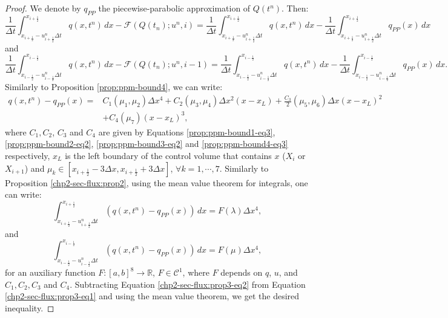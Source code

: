 \begin{proof}
	We denote by $q_{PP}$ the piecewise-parabolic approximation of $Q(t^n)$. Then:
	\begin{equation*}
	\frac{1}{\Delta t}\int^{x_{i+\frac{1}{2}}}_{x_{i+\frac{1}{2}}-u_{i+\frac{1}{2}}^n \Delta t} q(x,t^n)\,dx -
	\mathcal{F}(Q(t_n);u^n,i) = 	
	\frac{1}{\Delta t}\int^{x_{i+\frac{1}{2}}}_{x_{i+\frac{1}{2}}-u_{i+\frac{1}{2}}^n \Delta t} q(x,t^n)\,dx -
	\frac{1}{\Delta t}\int^{x_{i+\frac{1}{2}}}_{x_{i+\frac{1}{2}}-u_{i+\frac{1}{2}}^n \Delta t} q_{PP}(x)\,dx
	\end{equation*}
	and
	\begin{equation*}
	\frac{1}{\Delta t}\int^{x_{i-\frac{1}{2}}}_{x_{i-\frac{1}{2}}-u_{i-\frac{1}{2}}^n \Delta t} q(x,t^n)\,dx -
	\mathcal{F}(Q(t_n);u^n,i-1) = 	
	\frac{1}{\Delta t}\int^{x_{i-\frac{1}{2}}}_{x_{i-\frac{1}{2}}-u_{i-\frac{1}{2}}^n \Delta t} q(x,t^n)\,dx -
	\frac{1}{\Delta t}\int^{x_{i-\frac{1}{2}}}_{x_{i-\frac{1}{2}}-u_{i-\frac{1}{2}}^n \Delta t} q_{PP}(x)\,dx.
\end{equation*}
	Similarly to Proposition \ref{prop:ppm-bound4}, we can write:
	\begin{align*}
		q(x,t^n)-q_{PP}(x) = &C_1(\mu_1, \mu_2) \Delta x ^4 + C_2(\mu_3, \mu_4) \Delta x ^2(x-x_L)
		+ \frac{C_3}{2}(\mu_5, \mu_6)\Delta x (x-x_L)^2  \\&+C_4(\mu_7)(x-x_L)^3,
	\end{align*}
	where $C_1, C_2$, $C_3$ and $C_4$ are given by Equations \eqref{prop:ppm-bound1-eq3},
	\eqref{prop:ppm-bound2-eq2}, \eqref{prop:ppm-bound3-eq2} and \eqref{prop:ppm-bound4-eq3} respectively,
	$x_L$ is the left boundary of the control volume that contains $x$ ($X_i$ or $X_{i+1}$) and 
	$\mu_k \in [x_{i+\frac{1}{2}} - 3\Delta x,x_{i+\frac{1}{2}} + 3\Delta x]$, $\forall k =1, \cdots, 7$.
	Similarly to Proposition \ref{chp2-sec-flux:prop2}, using the mean value theorem for integrals, one can write:
	\begin{equation}
	\label{chp2-sec-flux:prop3-eq1}
	\int^{x_{i+\frac{1}{2}}}_{x_{i+\frac{1}{2}}-u_{i+\frac{1}{2}}^n \Delta t} (q(x,t^n)-q_{PP}(x))\,dx
	= F(\lambda)\Delta x ^4,
	\end{equation}
	and
	\begin{equation}
	\label{chp2-sec-flux:prop3-eq2}
	\int^{x_{i-\frac{1}{2}}}_{x_{i-\frac{1}{2}}-u_{i-\frac{1}{2}}^n \Delta t} (q(x,t^n)-q_{PP}(x))\,dx
	= F(\mu)\Delta x ^4,
	\end{equation}
	for an auxiliary function $F:[a,b]^8 \to \mathbb{R}$, $F\in\mathcal{C}^1$, where $F$ depends on $q$, $u$,
	and $C_1, C_2, C_3$ and $C_4$. Subtracting Equation \eqref{chp2-sec-flux:prop3-eq2} from Equation \eqref{chp2-sec-flux:prop3-eq1}
	and using the mean value theorem, we get the desired inequality.
	\end{proof}
